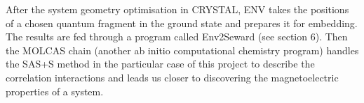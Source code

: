 \documentclass[10pt]{article}
\begin{document}
After the system geometry optimisation in CRYSTAL, ENV takes the positions of a chosen quantum fragment in the ground state and prepares it for embedding. The results are fed through a program called Env2Seward (see section 6). Then the MOLCAS chain (another ab initio computational chemistry program) handles the SAS+S method in the particular case of this project to describe the correlation interactions and leads us closer to discovering the magnetoelectric properties of a system. 



\end{document}
